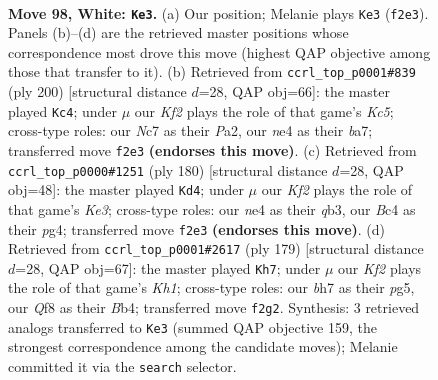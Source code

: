 \documentclass[11pt]{article}
\begin{document}
\clearpage

\begin{figure}[p]\centering
\begin{subfigure}{0.46\textwidth}\centering
\resizebox{\linewidth}{!}{%
\newchessgame
\chessboard[
  setfen={5Q2/2N4b/8/8/1pB1n1Pk/8/5K2/8 w - - 1 98},
  showmover=false,
  pgfstyle=straightmove, color=movearrow, markmove={f2-e3}
]}
\caption{}
\end{subfigure}\hfill
\begin{subfigure}{0.46\textwidth}\centering
\resizebox{\linewidth}{!}{%
\newchessgame
\chessboard[
  setfen={7k/b6P/5p2/2K2B2/8/8/P7/8 w - - 3 101},
  showmover=false,
  pgfstyle=straightmove, color=movearrow, markmove={c5-c4}
]}
\caption{}
\end{subfigure}
\\[4pt]
\begin{subfigure}{0.46\textwidth}\centering
\resizebox{\linewidth}{!}{%
\newchessgame
\chessboard[
  setfen={8/P3Q3/5pk1/8/6p1/1q2K1P1/8/8 w - - 7 91},
  showmover=false,
  pgfstyle=straightmove, color=movearrow, markmove={e3-d4}
]}
\caption{}
\end{subfigure}\hfill
\begin{subfigure}{0.46\textwidth}\centering
\resizebox{\linewidth}{!}{%
\newchessgame
\chessboard[
  setfen={7k/5Kp1/6N1/6P1/1b6/3B4/8/8 b - - 48 90},
  showmover=false,
  pgfstyle=straightmove, color=movearrow, markmove={h8-h7}
]}
\caption{}
\end{subfigure}
\caption{\textbf{Move 98, White: \texttt{Ke3}.} (a) Our position; Melanie plays \texttt{Ke3} (\texttt{f2e3}). Panels (b)--(d) are the retrieved master positions whose correspondence most drove this move (highest QAP objective among those that transfer to it). (b) Retrieved from \texttt{ccrl\_top\_p0001\#839} (ply 200) [structural distance $d$=28, QAP obj=66]: the master played \texttt{Kc4}; under $\mu$ our \emph{Kf2} plays the role of that game's \emph{Kc5}; cross-type roles: our \emph{N}c7 as their \emph{P}a2, our \emph{n}e4 as their \emph{b}a7; transferred move \texttt{f2e3} \textbf{(endorses this move)}. (c) Retrieved from \texttt{ccrl\_top\_p0000\#1251} (ply 180) [structural distance $d$=28, QAP obj=48]: the master played \texttt{Kd4}; under $\mu$ our \emph{Kf2} plays the role of that game's \emph{Ke3}; cross-type roles: our \emph{n}e4 as their \emph{q}b3, our \emph{B}c4 as their \emph{p}g4; transferred move \texttt{f2e3} \textbf{(endorses this move)}. (d) Retrieved from \texttt{ccrl\_top\_p0001\#2617} (ply 179) [structural distance $d$=28, QAP obj=67]: the master played \texttt{Kh7}; under $\mu$ our \emph{Kf2} plays the role of that game's \emph{Kh1}; cross-type roles: our \emph{b}h7 as their \emph{p}g5, our \emph{Q}f8 as their \emph{B}b4; transferred move \texttt{f2g2}. Synthesis: 3 retrieved analogs transferred to \texttt{Ke3} (summed QAP objective 159, the strongest correspondence among the candidate moves); Melanie committed it via the \texttt{search} selector.}
\label{fig:thought-m194}
\end{figure}
\end{document}
